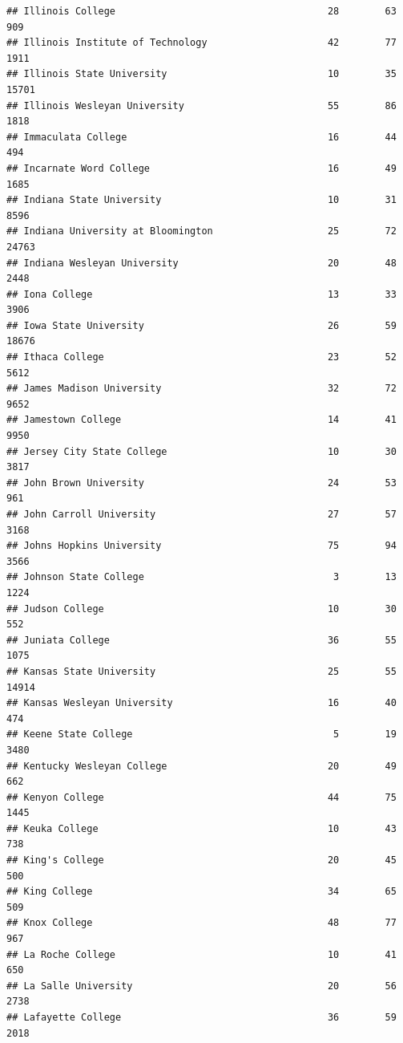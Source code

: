 \documentclass[
]{article}
\begin{document}
\begin{verbatim}
## Illinois College                                     28        63         909
## Illinois Institute of Technology                     42        77        1911
## Illinois State University                            10        35       15701
## Illinois Wesleyan University                         55        86        1818
## Immaculata College                                   16        44         494
## Incarnate Word College                               16        49        1685
## Indiana State University                             10        31        8596
## Indiana University at Bloomington                    25        72       24763
## Indiana Wesleyan University                          20        48        2448
## Iona College                                         13        33        3906
## Iowa State University                                26        59       18676
## Ithaca College                                       23        52        5612
## James Madison University                             32        72        9652
## Jamestown College                                    14        41        9950
## Jersey City State College                            10        30        3817
## John Brown University                                24        53         961
## John Carroll University                              27        57        3168
## Johns Hopkins University                             75        94        3566
## Johnson State College                                 3        13        1224
## Judson College                                       10        30         552
## Juniata College                                      36        55        1075
## Kansas State University                              25        55       14914
## Kansas Wesleyan University                           16        40         474
## Keene State College                                   5        19        3480
## Kentucky Wesleyan College                            20        49         662
## Kenyon College                                       44        75        1445
## Keuka College                                        10        43         738
## King's College                                       20        45         500
## King College                                         34        65         509
## Knox College                                         48        77         967
## La Roche College                                     10        41         650
## La Salle University                                  20        56        2738
## Lafayette College                                    36        59        2018

\end{verbatim}
\end{document}
